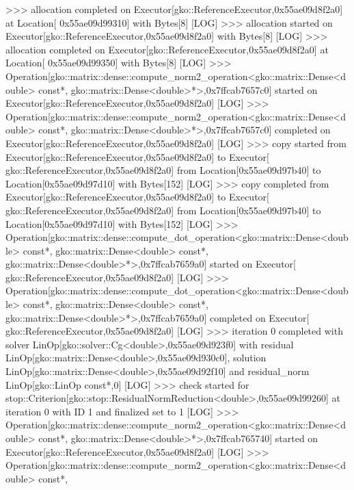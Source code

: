 \begin{DoxyCode}
[LOG] >>> allocation completed on Executor[gko::ReferenceExecutor,0x55ae09d8f2a0] at Location[
      0x55ae09d99310] with Bytes[8]
[LOG] >>> allocation started on Executor[gko::ReferenceExecutor,0x55ae09d8f2a0] with Bytes[8]
[LOG] >>> allocation completed on Executor[gko::ReferenceExecutor,0x55ae09d8f2a0] at Location[
      0x55ae09d99350] with Bytes[8]
[LOG] >>> Operation[gko::matrix::dense::compute\_norm2\_operation<gko::matrix::Dense<double> \textcolor{keyword}{const}*, 
      gko::matrix::Dense<double>*>,0x7ffcab7657c0] started on Executor[gko::ReferenceExecutor,0x55ae09d8f2a0]
[LOG] >>> Operation[gko::matrix::dense::compute\_norm2\_operation<gko::matrix::Dense<double> \textcolor{keyword}{const}*, 
      gko::matrix::Dense<double>*>,0x7ffcab7657c0] completed on Executor[gko::ReferenceExecutor,0x55ae09d8f2a0]
[LOG] >>> copy started from Executor[gko::ReferenceExecutor,0x55ae09d8f2a0] to Executor[
      gko::ReferenceExecutor,0x55ae09d8f2a0] from Location[0x55ae09d97b40] to Location[0x55ae09d97d10] with Bytes[152]
[LOG] >>> copy completed from Executor[gko::ReferenceExecutor,0x55ae09d8f2a0] to Executor[
      gko::ReferenceExecutor,0x55ae09d8f2a0] from Location[0x55ae09d97b40] to Location[0x55ae09d97d10] with Bytes[152]
[LOG] >>> Operation[gko::matrix::dense::compute\_dot\_operation<gko::matrix::Dense<double> \textcolor{keyword}{const}*, 
      gko::matrix::Dense<double> \textcolor{keyword}{const}*, gko::matrix::Dense<double>*>,0x7ffcab7659a0] started on Executor[
      gko::ReferenceExecutor,0x55ae09d8f2a0]
[LOG] >>> Operation[gko::matrix::dense::compute\_dot\_operation<gko::matrix::Dense<double> \textcolor{keyword}{const}*, 
      gko::matrix::Dense<double> \textcolor{keyword}{const}*, gko::matrix::Dense<double>*>,0x7ffcab7659a0] completed on Executor[
      gko::ReferenceExecutor,0x55ae09d8f2a0]
[LOG] >>> iteration 0 completed with solver LinOp[gko::solver::Cg<double>,0x55ae09d923f0] with residual 
      LinOp[gko::matrix::Dense<double>,0x55ae09d930c0], solution LinOp[gko::matrix::Dense<double>,0x55ae09d92f10] and
       residual\_norm LinOp[gko::LinOp \textcolor{keyword}{const}*,0]
[LOG] >>> check started \textcolor{keywordflow}{for} stop::Criterion[gko::stop::ResidualNormReduction<double>,0x55ae09d99260] at 
      iteration 0 with ID 1 and finalized \textcolor{keyword}{set} to 1
[LOG] >>> Operation[gko::matrix::dense::compute\_norm2\_operation<gko::matrix::Dense<double> \textcolor{keyword}{const}*, 
      gko::matrix::Dense<double>*>,0x7ffcab765740] started on Executor[gko::ReferenceExecutor,0x55ae09d8f2a0]
[LOG] >>> Operation[gko::matrix::dense::compute\_norm2\_operation<gko::matrix::Dense<double> \textcolor{keyword}{const}*, 

\end{DoxyCode}
